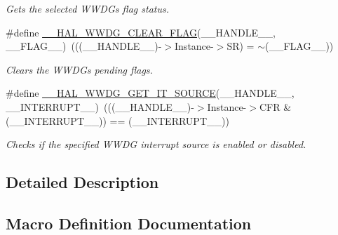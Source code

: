 \begin{DoxyCompactItemize}
\begin{DoxyCompactList}\small\item\em Gets the selected W\+W\+DG\textquotesingle{}s flag status. \end{DoxyCompactList}\item 
\#define \hyperlink{group___w_w_d_g___exported___macros_gae9c3b916e244deffc6a673d97df63671}{\+\_\+\+\_\+\+H\+A\+L\+\_\+\+W\+W\+D\+G\+\_\+\+C\+L\+E\+A\+R\+\_\+\+F\+L\+AG}(\+\_\+\+\_\+\+H\+A\+N\+D\+L\+E\+\_\+\+\_\+,  \+\_\+\+\_\+\+F\+L\+A\+G\+\_\+\+\_\+)~(((\+\_\+\+\_\+\+H\+A\+N\+D\+L\+E\+\_\+\+\_\+)-\/$>$Instance-\/$>$SR) = $\sim$(\+\_\+\+\_\+\+F\+L\+A\+G\+\_\+\+\_\+))
\begin{DoxyCompactList}\small\item\em Clears the W\+W\+DG\textquotesingle{}s pending flags. \end{DoxyCompactList}\item 
\#define \hyperlink{group___w_w_d_g___exported___macros_gaa3dae290aeb528ba7dbd1e7f481ef139}{\+\_\+\+\_\+\+H\+A\+L\+\_\+\+W\+W\+D\+G\+\_\+\+G\+E\+T\+\_\+\+I\+T\+\_\+\+S\+O\+U\+R\+CE}(\+\_\+\+\_\+\+H\+A\+N\+D\+L\+E\+\_\+\+\_\+,  \+\_\+\+\_\+\+I\+N\+T\+E\+R\+R\+U\+P\+T\+\_\+\+\_\+)~(((\+\_\+\+\_\+\+H\+A\+N\+D\+L\+E\+\_\+\+\_\+)-\/$>$Instance-\/$>$C\+FR \& (\+\_\+\+\_\+\+I\+N\+T\+E\+R\+R\+U\+P\+T\+\_\+\+\_\+)) == (\+\_\+\+\_\+\+I\+N\+T\+E\+R\+R\+U\+P\+T\+\_\+\+\_\+))
\begin{DoxyCompactList}\small\item\em Checks if the specified W\+W\+DG interrupt source is enabled or disabled. \end{DoxyCompactList}\end{DoxyCompactItemize}


\subsection{Detailed Description}


\subsection{Macro Definition Documentation}
